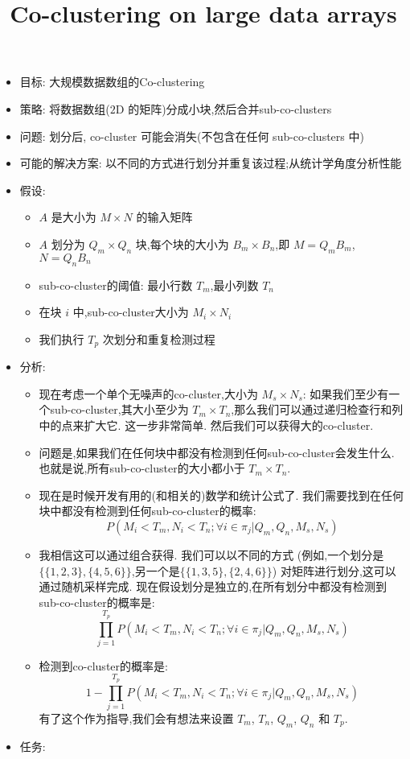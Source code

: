 \documentclass[12pt]{ctexart}
\title{Co-clustering on large data arrays}
\author{}
\date{}
\begin{document}
\maketitle
\begin{itemize}
    \item 目标: 大规模数据数组的Co-clustering
    \item 策略: 将数据数组($\mathrm{2D}$ 的矩阵)分成小块,然后合并sub-co-clusters
    \item 问题: 划分后, co-cluster 可能会消失(不包含在任何 sub-co-clusters 中)
    \item 可能的解决方案: 以不同的方式进行划分并重复该过程;从统计学角度分析性能

    \item 假设:
          \begin{itemize}
              \item $A$ 是大小为 $M\times N$ 的输入矩阵
              \item $A$ 划分为 $Q_m\times Q_n$ 块,每个块的大小为 $B_m\times B_n$,即 $M=Q_m B_m$, $N = Q_n B_n$
              \item sub-co-cluster的阈值: 最小行数 $T_m$,最小列数 $T_n$
              \item 在块 $i$ 中,sub-co-cluster大小为 $M_i\times N_i$
              \item 我们执行 $T_p$ 次划分和重复检测过程
          \end{itemize}
    \item 分析:

          \begin{itemize}
              \item 现在考虑一个单个无噪声的co-cluster,大小为 $M_s\times N_s$: 如果我们至少有一个sub-co-cluster,其大小至少为 $T_m\times T_n$,那么我们可以通过递归检查行和列中的点来扩大它. 这一步非常简单. 然后我们可以获得大的co-cluster. 
              \item 问题是,如果我们在任何块中都没有检测到任何sub-co-cluster会发生什么. 也就是说,所有sub-co-cluster的大小都小于 $T_m\times T_n$. 

              \item 现在是时候开发有用的(和相关的)数学和统计公式了. 我们需要找到在任何块中都没有检测到任何sub-co-cluster的概率: $$P(M_i < T_m, N_i < T_n ; \forall i \in \pi_j | Q_m, Q_n, M_s, N_s)$$
              \item 我相信这可以通过组合获得. 我们可以以不同的方式 (例如,一个划分是 \\ $\{\{1,2,3\},\{4,5,6\}\}$,另一个是$\{\{1,3,5\},\{2,4,6\}\}$) 对矩阵进行划分,这可以通过随机采样完成. 现在假设划分是独立的,在所有划分中都没有检测到sub-co-cluster的概率是: $$\prod_{j=1}^{T_p} P(M_i < T_m, N_i < T_n ; \forall i \in \pi_j | Q_m, Q_n, M_s, N_s)$$
              \item 检测到co-cluster的概率是: $$1 - \prod_{j=1}^{T_p} P(M_i < T_m, N_i < T_n ; \forall i \in \pi_j | Q_m, Q_n, M_s, N_s)$$ 有了这个作为指导,我们会有想法来设置 $T_m$, $T_n$, $Q_m$, $Q_n$ 和 $T_p$. 
          \end{itemize}
    \item 任务:
          \begin{itemize}


\end{itemize}
\end{itemize}
\end{document}
